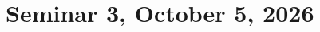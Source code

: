 \documentclass[10.5pt]{article}
\theoremstyle{definition}
\numberwithin{example}{subsection}
\numberwithin{proposition}{subsection}
\numberwithin{pb}{subsection}
\begin{document}
    \section{Seminar 3, October 5, 2026}
    
\end{document}
